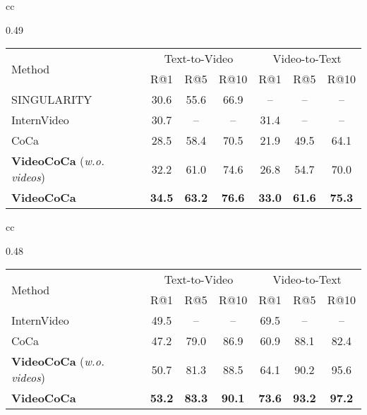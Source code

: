 \begin{table*}[t]
\begin{tabular}{cc}
  	
  	\begin{subtable}[t]{0.49\linewidth}
  	\vspace{-0.35\baselineskip}
		\centering
  		\caption{ActivityNet Captions}
  		\setlength{\tabcolsep}{2pt} \vspace{0.1\baselineskip}
  		\scriptsize{
	\begin{tabular}{l|ccc|ccc}
		\toprule 
 \multirow{2}{*}{Method} & \multicolumn{3}{c}{Text-to-Video} & \multicolumn{3}{c}{Video-to-Text} \\
 & \multirow{1}{*}{\footnotesize{R@1}} & \multirow{1}{*}{\footnotesize{R@5}} 
 & \multirow{1}{*}{\footnotesize{R@10}} & \multirow{1}{*}{\footnotesize{R@1}} 
 & \multirow{1}{*}{\footnotesize{R@5}}  & \multirow{1}{*}{\footnotesize{R@10}}  
 \\
 \midrule
SINGULARITY~\cite{lei2022revealing}  & 30.6 & 55.6 & 66.9 & -- & -- & -- \\ 
InternVideo~\cite{wang2022internvideo} & 30.7 & -- & -- & 31.4 & -- & --  \\
\midrule
CoCa & 28.5 & 58.4 & 70.5 & 21.9 & 49.5 & 64.1 \\
\textbf{VideoCoCa} (\textit{w.o. videos}) & 32.2 & 61.0 & 74.6 & 26.8 & 54.7 & 70.0  \\ 
\textbf{VideoCoCa} & \textbf{34.5} & \textbf{63.2} & \textbf{76.6} & \textbf{33.0} & \textbf{61.6} & \textbf{75.3}   \\ 

 \bottomrule
\end{tabular}	\label{tab:sota_activitynet_retrieval}
  		}
  	\end{subtable}
  	\end{tabular}
\begin{tabular}{cc}

	  	\begin{subtable}[t]{0.48\linewidth}
  		\setlength{\tabcolsep}{2pt} \centering
  		\caption{VATEX}
\scriptsize{
  			\begin{tabular}{l|ccc|ccc}
  				\toprule 
 \multirow{2}{*}{Method} & \multicolumn{3}{c}{Text-to-Video} & \multicolumn{3}{c}{Video-to-Text} \\
 & \multirow{1}{*}{\footnotesize{R@1}} & \multirow{1}{*}{\footnotesize{R@5}} 
 & \multirow{1}{*}{\footnotesize{R@10}} & \multirow{1}{*}{\footnotesize{R@1}} 
 & \multirow{1}{*}{\footnotesize{R@5}}  & \multirow{1}{*}{\footnotesize{R@10}}  
 \\ \midrule
InternVideo~\cite{wang2022internvideo} & 49.5 & -- & -- & 69.5 & -- & -- \\ \midrule
CoCa & 47.2 & 79.0 & 86.9 & 60.9 & 88.1 & 82.4  \\ 
\textbf{VideoCoCa} (\textit{w.o. videos}) & 50.7 & 81.3 & 88.5 & 64.1 & 90.2 & 95.6 \\ 
\textbf{VideoCoCa} & \textbf{53.2} & \textbf{83.3} & \textbf{90.1} &  \textbf{73.6} & \textbf{93.2} & \textbf{97.2}  \\ 
 \bottomrule
\end{tabular} \label{tab:sota_vatex_retrieval}
  		}
	\end{subtable}
	



\end{tabular}
\end{table*}
